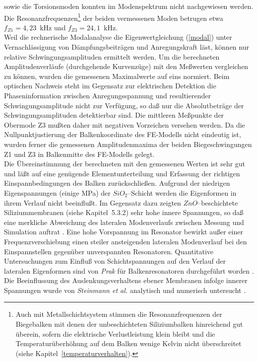 sowie die Torsionsmoden konnten im Modenspektrum nicht nachgewiesen
werden. Die Resonanzfrequenzen\footnote{Auch mit Metallschichtsystem
stimmen die Resonanzfrequenzen der Biegebalken mit denen der unbeschichteten
Siliziumbalken hinreichend gut überein, sofern die elektrische
Verlustleistung klein bleibt und die Temperaturüberhöhung auf dem Balken
wenige Kelvin nicht überschreitet (siehe Kapitel~\ref{temperaturverhalten}).}
der beiden vermessenen Moden betrugen etwa $f_{Z1} = 4,23$~kHz und
$f_{Z3} = 24,1$~kHz.\\
Weil die rechnerische Modalanalyse
die Eigenwertgleichung (\ref{modal}) unter Vernachlässigung von
Dämpfungsbeiträgen und Anregungskraft läst, können nur relative
Schwingungsamplituden ermittelt werden. Um die berechneten
Amplitudenverläufe (durchgehende Kurvenzüge) mit den Meßwerten vergleichen
zu können, wurden die gemessenen Maximalwerte auf eins normiert.
Beim optischen Nachweis steht im Gegensatz zur elektrischen Detektion
die Phaseninformation zwischen
Anregungsspannung und resultierender Schwingungsamplitude nicht zur
Verfügung, so daß nur die Absolutbeträge der Schwingungsamplituden
detektierbar sind. Die mittleren Meßpunkte der Obermode Z3 mußten daher
mit negativen Vorzeichen versehen werden.
Da die Nullpunktjustierung der Balkenkoordinate des FE-Modells nicht
eindeutig ist, wurden ferner die gemessenen Amplitudenmaxima der beiden
Biegeschwingungen Z1 und Z3 in Balkenmitte des FE-Modells gelegt.\\
%
Die Übereinstimmung der berechneten mit den gemessenen Werten ist sehr gut
und läßt auf eine genügende Elementunterteilung und Erfassung der
richtigen Einspannbedingungen des Balken zurückschließen. Aufgrund der
niedrigen Eigenspannungen (einige MPa) der $SiO_{2}$--Schicht werden die
Eigenformen in ihrem Verlauf nicht beeinflußt. Im Gegensatz dazu zeigten
$ZnO$--beschichtete Siliziummembranen (siehe Kapitel~5.3.2) sehr hohe innere
Spannungen, so daß eine merkliche Abweichung des lateralen Modenverlaufs
zwischen Messung und Simulation auftrat \cite{Fab92b}. Eine hohe Vorspannung
im Resonator bewirkt außer einer
Frequenzverschiebung einen steiler ansteigenden lateralen Modenverlauf bei
den Einspannstellen gegenüber unverspannten Resonatoren.
Quantitative Untersuchungen zum Einfluß von
Schichtspannungen auf den Verlauf der lateralen Eigenformen sind von
{\sl Prak} für Balkenresonatoren durchgeführt worden \cite{Pra93}. Die
Beeinflussung des Auslenkungsverhaltens ebener Membranen infolge innerer
Spannungen wurde von {\sl Steinmann et al.} analytisch und numerisch
untersucht \cite{Ste93}.

